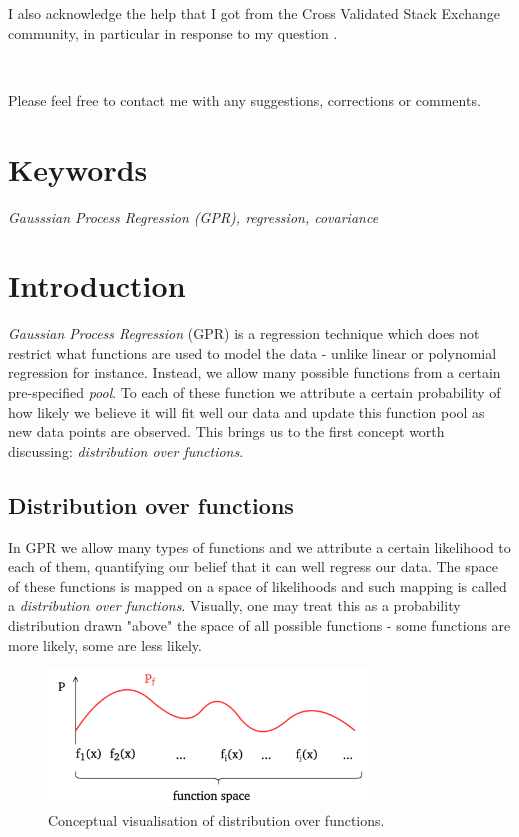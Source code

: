 \documentclass[10pt,twocolumn]{article}
\begin{document}
I also acknowledge the help that I got from the Cross Validated Stack Exchange community, in particular in response to my question \cite{SE}.

\,\,

Please feel free to contact me with any suggestions, corrections or comments.

\section*{Keywords}

\textit{Gausssian Process Regression (GPR), regression, covariance}

\tableofcontents

\section{Introduction}

\textit{Gaussian Process Regression} (GPR) is a regression technique which does not restrict what functions are used to model the data - unlike linear or polynomial regression for instance. Instead, we allow many possible functions from a certain pre-specified \textit{pool}. To each of these function we attribute a certain probability of how likely we believe it will fit well our data and update this function pool as new data points are observed. This brings us to the first concept worth discussing: \textit{distribution over functions}.


\subsection{Distribution over functions} \label{sec:dist_over_fun}

In GPR we allow many types of functions and we attribute a certain likelihood to each of them, quantifying our belief that it can well regress our data. The space of these functions is mapped on a space of likelihoods and such mapping is called a \textit{distribution over functions}. Visually, one may treat this as a probability distribution drawn "above" the space of all possible functions - some functions are more likely, some are less likely.

\begin{figure}[H]
\centering\includegraphics[width=8.5cm]{distr_over_fun.png}
\caption{Conceptual visualisation of distribution over functions.}
\label{fig:distr_over_fun}
\end{figure}
\end{document}
